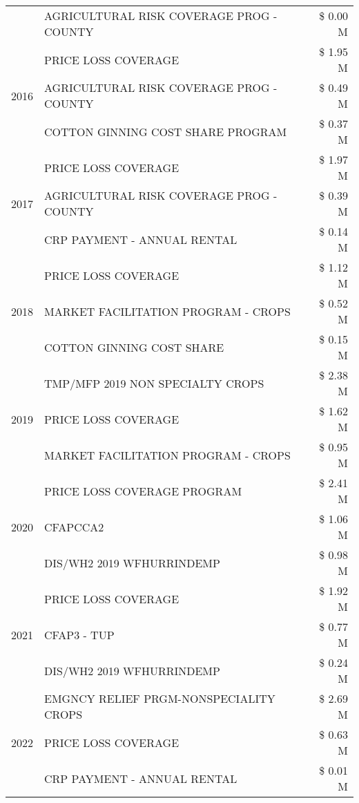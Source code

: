 \begin{tabular}{llr}
 & AGRICULTURAL RISK COVERAGE PROG - COUNTY & \$ 0.00 M \\
\cline{1-3}
\multirow[t]{3}{*}{2016} & PRICE LOSS COVERAGE & \$ 1.95 M \\
 & AGRICULTURAL RISK COVERAGE PROG - COUNTY & \$ 0.49 M \\
 & COTTON GINNING COST SHARE PROGRAM & \$ 0.37 M \\
\cline{1-3}
\multirow[t]{3}{*}{2017} & PRICE LOSS COVERAGE & \$ 1.97 M \\
 & AGRICULTURAL RISK COVERAGE PROG - COUNTY & \$ 0.39 M \\
 & CRP PAYMENT - ANNUAL RENTAL & \$ 0.14 M \\
\cline{1-3}
\multirow[t]{3}{*}{2018} & PRICE LOSS COVERAGE & \$ 1.12 M \\
 & MARKET FACILITATION PROGRAM - CROPS & \$ 0.52 M \\
 & COTTON GINNING COST SHARE & \$ 0.15 M \\
\cline{1-3}
\multirow[t]{3}{*}{2019} & TMP/MFP 2019 NON SPECIALTY CROPS & \$ 2.38 M \\
 & PRICE LOSS COVERAGE & \$ 1.62 M \\
 & MARKET FACILITATION PROGRAM - CROPS & \$ 0.95 M \\
\cline{1-3}
\multirow[t]{3}{*}{2020} & PRICE LOSS COVERAGE PROGRAM & \$ 2.41 M \\
 & CFAPCCA2 & \$ 1.06 M \\
 & DIS/WH2 2019 WFHURRINDEMP & \$ 0.98 M \\
\cline{1-3}
\multirow[t]{3}{*}{2021} & PRICE LOSS COVERAGE & \$ 1.92 M \\
 & CFAP3 - TUP & \$ 0.77 M \\
 & DIS/WH2 2019 WFHURRINDEMP & \$ 0.24 M \\
\cline{1-3}
\multirow[t]{3}{*}{2022} & EMGNCY RELIEF PRGM-NONSPECIALITY CROPS & \$ 2.69 M \\
 & PRICE LOSS COVERAGE & \$ 0.63 M \\
 & CRP PAYMENT - ANNUAL RENTAL & \$ 0.01 M \\
\cline{1-3}
\bottomrule
\end{tabular}
